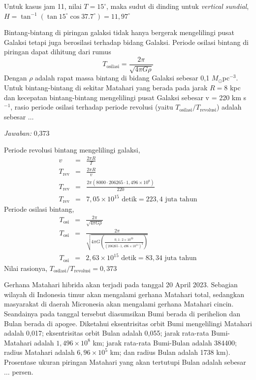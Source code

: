 \documentclass[11pt,fleqn]{exam}
\newcommand*{\kms}{km s\ensuremath{^{-1}}}
\begin{document}
\begin{questions}
\begin{enumerate}[A.]
Untuk kasus jam 11, nilai $T = 15^{\circ}$, maka sudut di dinding untuk \textit{vertical sundial}, $H = \tan^{-1}(\tan{15^{\circ}} \cos{37.7^{\circ}}) = 11,97^{\circ}$


\end{enumerate}




\vspace{0.5cm}
\question Bintang-bintang di piringan galaksi tidak hanya bergerak mengelilingi pusat Galaksi tetapi juga berosilasi terhadap bidang Galaksi. Periode osilasi bintang di piringan dapat dihitung dari rumus
$$T_\text{osilasi} = \frac{2\pi}{\sqrt{4 \pi G \rho}}$$
Dengan $\rho$ adalah rapat massa bintang di bidang Galaksi sebesar 0,1 $M_\odot$pc$^{-3}$. Untuk bintang-bintang di sekitar Matahari yang berada pada jarak $R=8$ kpc dan kecepatan bintang-bintang mengelilingi pusat Galaksi sebesar v = 220 \kms, rasio periode osilasi terhadap periode revolusi (yaitu $T_\text{osilasi}/T_\text{revolusi}$) adalah sebesar $\ldots$ 

\bigskip
\textit{Jawaban: } 0,373

Periode revolusi bintang mengelilingi galaksi,
\begin{eqnarray*}
    v &=& \frac{2 \pi R}{T}\\
    T_\text{rev} &=& \frac{2 \pi R}{v}\\
    T_\text{rev} &=& \frac{2 \pi (8000 \cdot 206265 \cdot 1,496 \times 10^8)}{220}\\
    T_\text{rev} &=& 7,05 \times 10^{15} \text{ detik} = 223,4 \text{ juta tahun}
\end{eqnarray*}
Periode osilasi bintang,
\begin{eqnarray*}
    T_\text{osi} &=& \frac{2 \pi}{\sqrt{4 \pi G \rho}}\\
    T_\text{osi} &=& \frac{2 \pi}{\sqrt{4 \pi G \left(\frac{0,1 \cdot 2 \times 10^{30}}{(206265 \cdot 1,496 \times 10^{11})^3} \right) }}\\
    T_\text{osi} &=& 2,63 \times 10^{15} \text{ detik} = 83,34 \text{ juta tahun}
\end{eqnarray*}
Nilai rasionya, $T_\text{osilasi}/T_\text{revolusi} = 0,373$


\vspace{0.5cm}
\question Gerhana Matahari hibrida akan terjadi pada tanggal 20 April 2023. Sebagian wilayah di Indonesia timur akan mengalami gerhana Matahari total, sedangkan masyarakat di daerah Micronesia akan mengalami gerhana Matahari cincin. Seandainya pada tanggal tersebut diasumsikan Bumi berada di perihelion dan Bulan berada di apogee. Diketahui eksentrisitas orbit Bumi mengelilingi Matahari adalah 0,017; eksentrisitas orbit Bulan adalah 0,055; jarak rata-rata Bumi-Matahari adalah $1,496 \times 10^8$ km; jarak rata-rata Bumi-Bulan adalah 384400; radius Matahari adalah $6,96 \times 10^5$ km; dan radius Bulan adalah 1738 km). Prosentase ukuran piringan Matahari yang akan tertutupi Bulan adalah sebesar $\ldots$ persen.


\end{questions}
\end{document}
